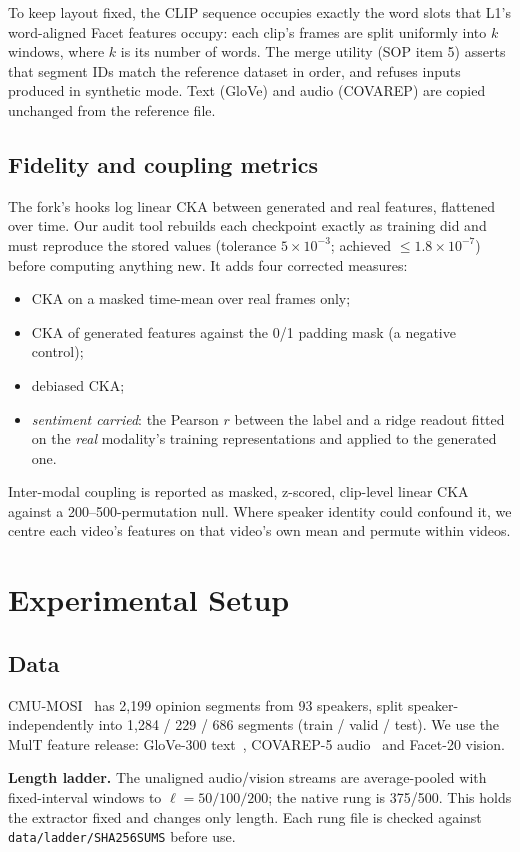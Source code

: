 \documentclass[lettersize,journal]{IEEEtran}
\begin{document}
To keep layout fixed, the CLIP sequence occupies exactly the word slots that L1's word-aligned Facet features occupy: each clip's frames are split uniformly into $k$ windows, where $k$ is its number of words. The merge utility (SOP item 5) asserts that segment IDs match the reference dataset in order, and refuses inputs produced in synthetic mode. Text (GloVe) and audio (COVAREP) are copied unchanged from the reference file.

\subsection{Fidelity and coupling metrics}
The fork's hooks log linear CKA between generated and real features, flattened over time. Our audit tool rebuilds each checkpoint exactly as training did and must reproduce the stored values (tolerance $5\times10^{-3}$; achieved $\le 1.8\times10^{-7}$) before computing anything new. It adds four corrected measures:
\begin{itemize}
\item CKA on a masked time-mean over real frames only;
\item CKA of generated features against the 0/1 padding mask (a negative control);
\item debiased CKA;
\item \emph{sentiment carried}: the Pearson $r$ between the label and a ridge readout fitted on the \emph{real} modality's training representations and applied to the generated one.
\end{itemize}
Inter-modal coupling is reported as masked, z-scored, clip-level linear CKA against a 200--500-permutation null. Where speaker identity could confound it, we centre each video's features on that video's own mean and permute within videos.

\section{Experimental Setup}
\subsection{Data}
CMU-MOSI~\cite{zadeh2016mosi} has 2,199 opinion segments from 93 speakers, split speaker-independently into 1,284 / 229 / 686 segments (train / valid / test). We use the MulT feature release: GloVe-300 text~\cite{pennington2014glove}, COVAREP-5 audio~\cite{degottex2014covarep} and Facet-20 vision.

\textbf{Length ladder.} The unaligned audio/vision streams are average-pooled with fixed-interval windows to $\ell=50/100/200$; the native rung is 375/500. This holds the extractor fixed and changes only length. Each rung file is checked against \texttt{data/ladder/SHA256SUMS} before use.
\end{document}
